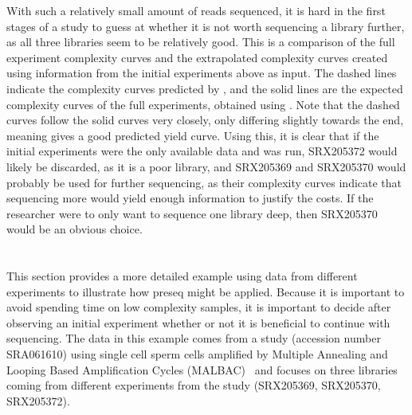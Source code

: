 \documentclass[11pt, titlepage]{article}
\begin{document}
With such a relatively small amount of reads sequenced, it is hard in the first stages of a study to guess at whether it is not worth sequencing a library further, as all three libraries seem to be relatively good. 
\newpage
This is a comparison of the full experiment complexity curves and the extrapolated complexity curves created using information from the initial experiments above as input. The dashed lines indicate the complexity curves predicted by , and the solid lines are the expected complexity curves of the full experiments, obtained using . Note that the dashed curves follow the solid curves very closely, only differing slightly towards the end, meaning  gives a good predicted yield curve.  Using this, it is clear that if the initial experiments were the only available data and  was run, SRX205372 would likely be discarded, as it is a poor library, and SRX205369 and SRX205370 would probably be used for further sequencing, as their complexity curves indicate that sequencing more would yield enough information to justify the costs.  If the researcher were to only want to sequence one library deep, then SRX205370 would be an obvious choice. 
\newline
\newline
\begin{figure}[h!]
\centering
{}
\end{figure}

\newpage







\section{}
\label{sec:multlib}
This section provides a more detailed example using data from different experiments to illustrate how preseq might be applied. Because it is important to avoid spending time on low complexity samples, it is important to decide after observing an initial experiment whether or not it is beneficial to continue with sequencing. The data in this example comes from a study (accession number SRA061610) using single cell sperm cells amplified by Multiple Annealing and Looping Based Amplification Cycles (MALBAC)~\cite{lu2012probing} and focuses on three libraries coming from different experiments from the study (SRX205369, SRX205370, SRX205372). 
\end{document}
